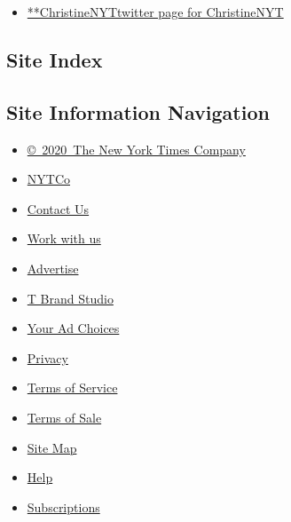 \begin{itemize}
\tightlist
\item
  \href{https://twitter.com/ChristineNYT}{**ChristineNYTtwitter page for
  ChristineNYT}
\end{itemize}

\hypertarget{site-index}{%
\subsection{Site Index}\label{site-index}}

\hypertarget{site-information-navigation}{%
\subsection{Site Information
Navigation}\label{site-information-navigation}}

\begin{itemize}
\tightlist
\item
  \href{https://help.nytimes.com/hc/en-us/articles/115014792127-Copyright-notice}{©~2020~The
  New York Times Company}
\end{itemize}

\begin{itemize}
\tightlist
\item
  \href{https://www.nytco.com/}{NYTCo}
\item
  \href{https://help.nytimes.com/hc/en-us/articles/115015385887-Contact-Us}{Contact
  Us}
\item
  \href{https://www.nytco.com/careers/}{Work with us}
\item
  \href{https://nytmediakit.com/}{Advertise}
\item
  \href{http://www.tbrandstudio.com/}{T Brand Studio}
\item
  \href{https://www.nytimes.com/privacy/cookie-policy\#how-do-i-manage-trackers}{Your
  Ad Choices}
\item
  \href{https://www.nytimes.com/privacy}{Privacy}
\item
  \href{https://help.nytimes.com/hc/en-us/articles/115014893428-Terms-of-service}{Terms
  of Service}
\item
  \href{https://help.nytimes.com/hc/en-us/articles/115014893968-Terms-of-sale}{Terms
  of Sale}
\item
  \href{https://spiderbites.nytimes.com}{Site Map}
\item
  \href{https://help.nytimes.com/hc/en-us}{Help}
\item
  \href{https://www.nytimes.com/subscription?campaignId=37WXW}{Subscriptions}
\end{itemize}
